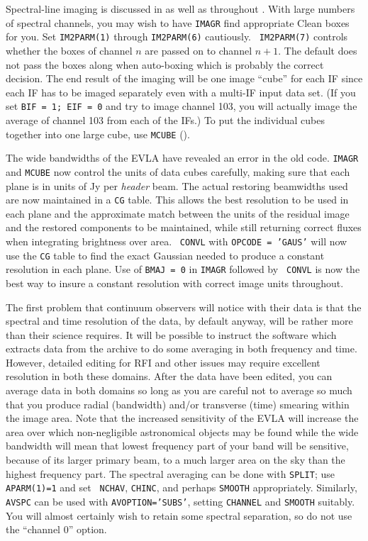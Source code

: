 Spectral-line imaging is discussed in  as well as
throughout .  With large numbers of spectral channels,
you may wish to have {\tt IMAGR} find appropriate Clean boxes for you.
Set {\tt IM2PARM(1)} through {\tt IM2PARM(6)} cautiously.  {\tt
IM2PARM(7)} controls whether the boxes of channel $n$ are passed on to
channel $n+1$.  The default does not pass the boxes along when
auto-boxing which is probably the correct decision.  The end result of
the imaging will be one image ``cube'' for each IF since each IF has
to be imaged separately even with a multi-IF input data set.  (If you
set {\tt BIF = 1; EIF = 0} and try to image channel 103, you will
actually image the average of channel 103 from each of the IFs.)  To
put the individual cubes together into one large cube, use {\tt MCUBE}
().

The wide bandwidths of the EVLA have revealed an error in the old
code.  {\tt IMAGR} and {\tt MCUBE} now control the units of data cubes
carefully, making sure that each plane is in units of Jy per {\it
header} beam.  The actual restoring beamwidths used are now maintained
in a {\tt CG} table.  This allows the best resolution to be used in
each plane and the approximate match between the units of the residual
image and the restored components to be maintained, while still
returning correct fluxes when integrating brightness over area.  {\tt
CONVL} with {\tt OPCODE = 'GAUS'} will now use the {\tt CG} table to
find the exact Gaussian needed to produce a constant resolution in
each plane.  Use of {\tt BMAJ = 0} in {\tt IMAGR} followed by {\tt
CONVL} is now the best way to insure a constant resolution with
correct image units throughout.


The first problem that continuum observers will notice with their
 data is that the spectral and time resolution of the data,
by default anyway, will be rather more than their science requires.
It will be possible to instruct the software which extracts data from
the archive to do some averaging in both frequency and time.  However,
detailed editing for RFI and other issues may require excellent
resolution in both these domains.  After the data have been edited,
you can average data in both domains so long as you are careful not to
average so much that you produce radial (bandwidth) and/or transverse
(time) smearing within the image area.  Note that the increased
sensitivity of the EVLA will increase the area over which
non-negligible astronomical objects may be found while the wide
bandwidth will mean that lowest frequency part of your band will be
sensitive, because of its larger primary beam, to a much larger area
on the sky than the highest frequency part.  The spectral averaging
can be done with {\tt SPLIT}; use {\tt APARM(1)=1} and set {\tt
NCHAV}, {\tt CHINC}, and perhaps {\tt SMOOTH} appropriately.
Similarly, {\tt AVSPC} can be used with {\tt AVOPTION='SUBS'}, setting
{\tt CHANNEL} and {\tt SMOOTH} suitably.  You will almost certainly
wish to retain some spectral separation, so do not use the ``channel
0'' option.

